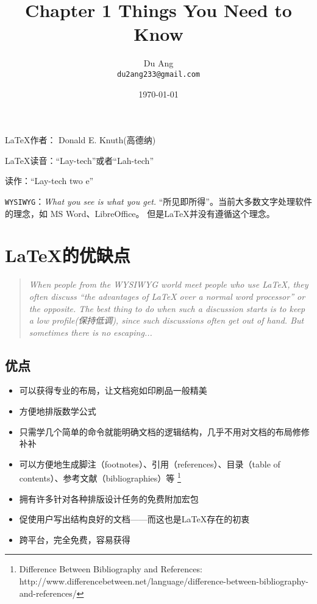 \documentclass[UTF8]{ctexart}
\title{\heiti Chapter 1 Things You Need to Know}
\author{\kaishu Du Ang \\ \texttt{du2ang233@gmail.com} }
\date{\today}
\begin{document}
\maketitle

\LaTeX 作者： Donald E. Knuth(高德纳)

\LaTeX 读音：“Lay-tech”或者“Lah-tech”

\LaTeXe 读作：“Lay-tech two e”

\texttt{WYSIWYG}：\emph{What you see is what you get.} “所见即所得”。当前大多数文字处理软件的理念，如 MS Word、LibreOffice。
但是\LaTeX 并没有遵循这个理念。

\section{\LaTeX 的优缺点}
\begin{quotation}
    \emph{ When people from the WYSIWYG world meet people who use \LaTeX, they
    often discuss “the advantages of \LaTeX{} over a normal word processor” or the
    opposite. The best thing to do when such a discussion starts is to keep a low
    profile(保持低调), since such discussions often get out of hand. But sometimes there is
    no escaping... }
\end{quotation}
\subsection{优点}
\begin{itemize}
    \item 可以获得专业的布局，让文档宛如印刷品一般精美
    \item 方便地排版数学公式
    \item 只需学几个简单的命令就能明确文档的逻辑结构，几乎不用对文档的布局修修补补
    \item 可以方便地生成脚注（footnotes）、引用（references）、目录（table of contents）、参考文献（bibliographies）等
            \footnote{Difference Between Bibliography and References:
            http://www.differencebetween.net/language/difference-between-bibliography-and-references/}
    \item 拥有许多针对各种排版设计任务的免费附加宏包
    \item 促使用户写出结构良好的文档——而这也是\LaTeX 存在的初衷
    \item 跨平台，完全免费，容易获得
\end{itemize}
\end{document}

